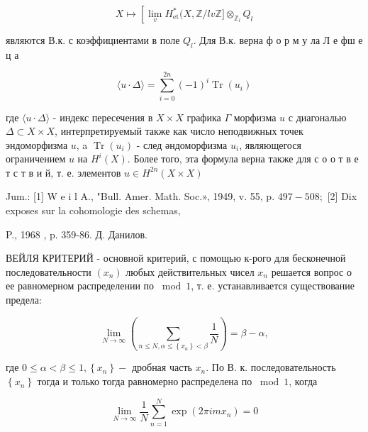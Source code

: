 \documentclass[10pt]{article}
\begin{document}
\[

X \mapsto\left[\lim _{v} H_{\mathrm{et}}^{*}(X, \mathbb{Z} / l v \mathbb{Z}] \otimes_{\mathbb{Z}_{l}} Q_{l}\right.

\]



являются В.к. с коэффициентами в поле $Q_{l}$. Для В.к. верна ф о р м у ла Л е фш е ц а



\[

\langle u \cdot \Delta\rangle=\sum_{i=0}^{2 n}(-1)^{i} \operatorname{Tr}\left(u_{i}\right)

\]



где $\langle u \cdot \Delta\rangle$ - индекс пересечения в $X \times X$ графика $\Gamma$ морфизма $u$ с диагональю $\Delta \subset X \times X$, интерпретируемый также как число неподвижных точек эндоморфизма $u$, a $\operatorname{Tr}\left(u_{i}\right)$ - след әндоморфизма $u_{i}$, являющегося ограничением $u$ на $H^{i}(X)$. Более того, эта формула верна также для с о о т в е т с т в и й, т. е. элементов $u \in H^{2 n}(X \times X)$



Jum.: [1] W e i l A., "Bull. Amer. Math. Soc.», 1949, v. 55, p. $497-508 ;$ [2] Dix exposes sur la cohomologie des schemas,

P., 1968 , p. 359-86. Д. Данилов.



ВЕЙЛЯ КРИТЕРИЙ - основной критерий, с помощью к-рого для бесконечной последовательности $\left(x_{n}\right)$ любых действительных чисел $x_{n}$ решается вопрос о ее равномерном распределении по $\bmod 1$, т. е. устанавливается существование предела:



\[

\lim _{N \rightarrow \infty}\left(\sum_{n \leqslant N, \alpha \leqslant\left\{x_{n}\right\}<\beta} \frac{1}{N}\right)=\beta-\alpha,

\]



где $0 \leqslant \alpha<\beta \leqslant 1,\left\{x_{n}\right\}-$ дробная часть $x_{n}$. По В. к. последовательность $\left\{x_{n}\right\}$ тогда и только тогда равномерно распределена по $\bmod 1$, когда



\[

\lim _{N \rightarrow \infty} \frac{1}{N} \sum_{n=1}^{N} \exp \left(2 \pi i m x_{n}\right)=0

\]
\end{document}
